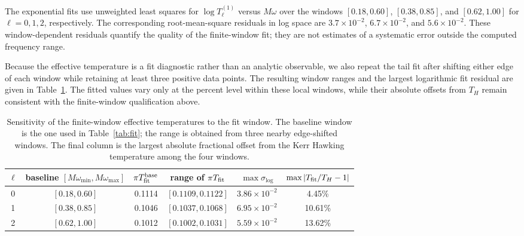\documentclass[aps,prd,twocolumn,10pt,nofootinbib,superscriptaddress,floatfix]{revtex4-2}
\begin{document}
The exponential fits use unweighted least squares for
$\log T_\ell^{(1)}$ versus $M\omega$ over the windows
$[0.18,0.60]$, $[0.38,0.85]$, and $[0.62,1.00]$ for
$\ell=0,1,2$, respectively.  The corresponding root-mean-square residuals
in log space are $3.7\times10^{-2}$, $6.7\times10^{-2}$, and
$5.6\times10^{-2}$.  These window-dependent residuals quantify the quality
of the finite-window fit; they are not estimates of a systematic error outside
the computed frequency range.

Because the effective temperature is a fit diagnostic rather than an analytic
observable, we also repeat the tail fit after shifting either edge of each
window while retaining at least three positive data points.  The resulting
window ranges and the largest logarithmic fit residual are given in
Table~\ref{tab:tail-window}.  The fitted values vary only at the percent level
within these local windows, while their absolute offsets from $T_H$ remain
consistent with the finite-window qualification above.

\begin{table}[t]
\caption{Sensitivity of the finite-window effective temperatures to the fit
window.  The baseline window is the one used in Table~\ref{tab:fit}; the range
is obtained from three nearby edge-shifted windows.  The final column is the
largest absolute fractional offset from the Kerr Hawking temperature among
the four windows.}
\label{tab:tail-window}
\begin{ruledtabular}
\begin{tabular}{c c c c c c}
$\ell$ & baseline $[M\omega_{\min},M\omega_{\max}]$
& $\pi T_{\rm fit}^{\rm base}$ & range of $\pi T_{\rm fit}$
& $\max\sigma_{\log}$ & $\max|T_{\rm fit}/T_H-1|$\\
\hline
0 & $[0.18,0.60]$ & 0.1114 & $[0.1109,0.1122]$ & $3.86\times10^{-2}$ & 4.45\%\\
1 & $[0.38,0.85]$ & 0.1046 & $[0.1037,0.1068]$ & $6.95\times10^{-2}$ & 10.61\%\\
2 & $[0.62,1.00]$ & 0.1012 & $[0.1002,0.1031]$ & $5.59\times10^{-2}$ & 13.62\%\\
\end{tabular}
\end{ruledtabular}
\end{table}
\end{document}
